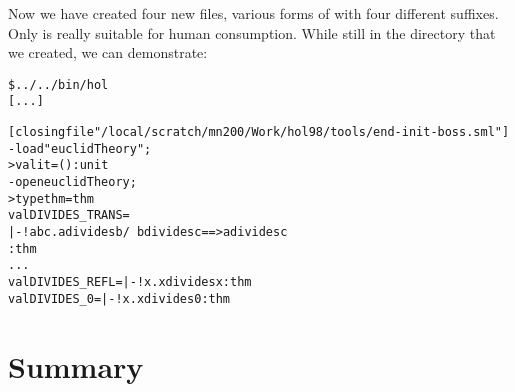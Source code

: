 Now we have created four new files, various forms of 
with four different suffixes.  Only  is really
suitable for human consumption.  While still in the 
directory that we created, we can demonstrate:

\begin{session}
\begin{alltt}
\$ ../../bin/hol
[...]

[closing file "/local/scratch/mn200/Work/hol98/tools/end-init-boss.sml"]
- load "euclidTheory";
> val it = () : unit
- open euclidTheory;
> type thm = thm
  val DIVIDES_TRANS =
    |- !a b c. a divides b /\ b divides c ==> a divides c
    : thm
  ...
  val DIVIDES_REFL = |- !x. x divides x : thm
  val DIVIDES_0 = |- !x. x divides 0 : thm
\end{alltt}
\end{session}

\section{Summary}

